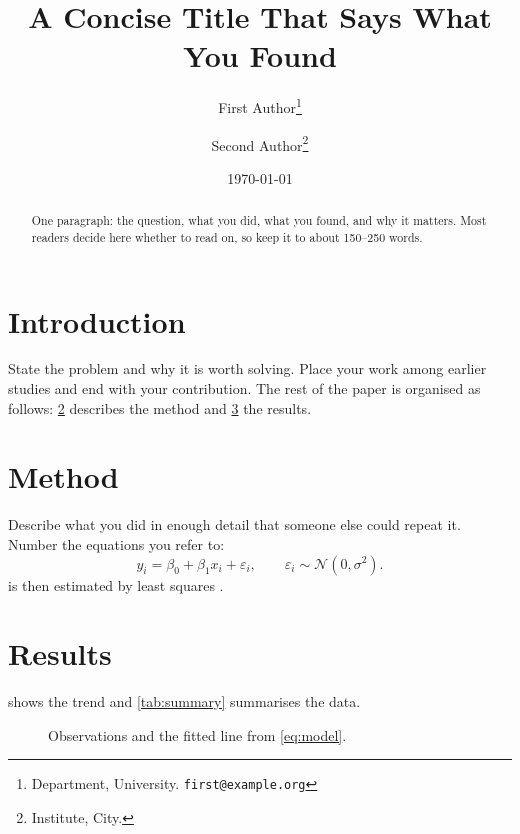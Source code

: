\documentclass[11pt]{article}
\title{A Concise Title That Says What You Found}
\author{%
  First Author\thanks{Department, University. \texttt{first@example.org}}
  \and
  Second Author\thanks{Institute, City.}}
\date{\today}
\begin{document}
\maketitle

\begin{abstract}
  One paragraph: the question, what you did, what you found, and why it
  matters. Most readers decide here whether to read on, so keep it to about
  150--250 words.
\end{abstract}

\section{Introduction}
\label{sec:introduction}
State the problem and why it is worth solving. Place your work among earlier
studies \parencite{doe2021,roe2019} and end with your contribution. The rest of
the paper is organised as follows: \cref{sec:method} describes the method and
\cref{sec:results} the results.

\section{Method}
\label{sec:method}
Describe what you did in enough detail that someone else could repeat it.
Number the equations you refer to:
\begin{equation}
  \label{eq:model}
  y_i = \beta_0 + \beta_1 x_i + \varepsilon_i,
  \qquad \varepsilon_i \sim \mathcal{N}(0,\sigma^2).
\end{equation}
 is then estimated by least squares \parencite{roe2019}.

\section{Results}
\label{sec:results}
 shows the trend and \cref{tab:summary} summarises the data.

\begin{figure}[htbp]
  \centering
  \caption{Observations and the fitted line from \cref{eq:model}.}
  \label{fig:trend}
\end{figure}
\end{document}
